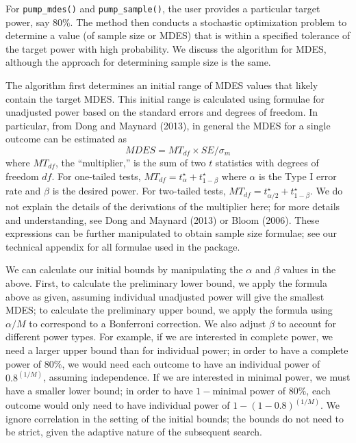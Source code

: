 \documentclass[
]{article}
\begin{document}
For \texttt{pump\_mdes()} and \texttt{pump\_sample()}, the user provides
a particular target power, say \(80\%\). The method then conducts a
stochastic optimization problem to determine a value (of sample size or
MDES) that is within a specified tolerance of the target power with high
probability. We discuss the algorithm for MDES, although the approach
for determining sample size is the same.

The algorithm first determines an initial range of MDES values that
likely contain the target MDES. This initial range is calculated using
formulae for unadjusted power based on the standard errors and degrees
of freedom. In particular, from Dong and Maynard (2013), in general the
MDES for a single outcome can be estimated as
\[ MDES = MT_{df} \times SE / \sigma_{m} \] where \(MT_{df}\), the
``multiplier,'' is the sum of two \(t\) statistics with degrees of
freedom \(df\). For one-tailed tests,
\(MT_{df} = t_{\alpha}^\star + t_{1-\beta}^\star\) where \(\alpha\) is
the Type I error rate and \(\beta\) is the desired power. For two-tailed
tests, \(MT_{df} = t_{\alpha/2}^\star + t_{1-\beta}^\star\). We do not
explain the details of the derivations of the multiplier here; for more
details and understanding, see Dong and Maynard (2013) or Bloom (2006).
These expressions can be further manipulated to obtain sample size
formulae; see our technical appendix for all formulae used in the
package.

We can calculate our initial bounds by manipulating the \(\alpha\) and
\(\beta\) values in the above. First, to calculate the preliminary lower
bound, we apply the formula above as given, assuming individual
unadjusted power will give the smallest MDES; to calculate the
preliminary upper bound, we apply the formula using \(\alpha/M\) to
correspond to a Bonferroni correction. We also adjust \(\beta\) to
account for different power types. For example, if we are interested in
complete power, we need a larger upper bound than for individual power;
in order to have a complete power of \(80\%\), we would need each
outcome to have an individual power of \(\text{0.8}^{(1/M)}\), assuming
independence. If we are interested in minimal power, we must have a
smaller lower bound; in order to have \(1-\)minimal power of \(80\%\),
each outcome would only need to have individual power of
\(1 - (1 - \text{0.8})^{(1/M)}\). We ignore correlation in the setting
of the initial bounds; the bounds do not need to be strict, given the
adaptive nature of the subsequent search.
\end{document}
